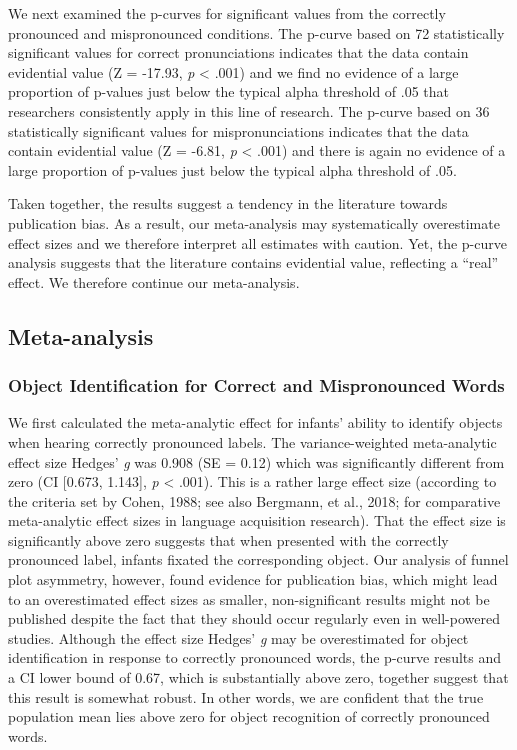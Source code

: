 \documentclass[man]{apa6}
\theoremstyle{definition}
\theoremstyle{definition}
\theoremstyle{definition}
\theoremstyle{remark}
\begin{document}
We next examined the p-curves for significant values from the correctly
pronounced and mispronounced conditions. The p-curve based on 72
statistically significant values for correct pronunciations indicates
that the data contain evidential value (Z = -17.93, \emph{p} \textless{}
.001) and we find no evidence of a large proportion of p-values just
below the typical alpha threshold of .05 that researchers consistently
apply in this line of research. The p-curve based on 36 statistically
significant values for mispronunciations indicates that the data contain
evidential value (Z = -6.81, \emph{p} \textless{} .001) and there is
again no evidence of a large proportion of p-values just below the
typical alpha threshold of .05.

Taken together, the results suggest a tendency in the literature towards
publication bias. As a result, our meta-analysis may systematically
overestimate effect sizes and we therefore interpret all estimates with
caution. Yet, the p-curve analysis suggests that the literature contains
evidential value, reflecting a \enquote{real} effect. We therefore
continue our meta-analysis.

\subsection{Meta-analysis}\label{meta-analysis-1}

\subsubsection{Object Identification for Correct and Mispronounced
Words}\label{object-identification-for-correct-and-mispronounced-words}

We first calculated the meta-analytic effect for infants' ability to
identify objects when hearing correctly pronounced labels. The
variance-weighted meta-analytic effect size Hedges' \emph{g} was 0.908
(SE = 0.12) which was significantly different from zero (CI {[}0.673,
1.143{]}, \emph{p} \textless{} .001). This is a rather large effect size
(according to the criteria set by Cohen, 1988; see also Bergmann, et
al., 2018; for comparative meta-analytic effect sizes in language
acquisition research). That the effect size is significantly above zero
suggests that when presented with the correctly pronounced label,
infants fixated the corresponding object. Our analysis of funnel plot
asymmetry, however, found evidence for publication bias, which might
lead to an overestimated effect sizes as smaller, non-significant
results might not be published despite the fact that they should occur
regularly even in well-powered studies. Although the effect size Hedges'
\emph{g} may be overestimated for object identification in response to
correctly pronounced words, the p-curve results and a CI lower bound of
0.67, which is substantially above zero, together suggest that this
result is somewhat robust. In other words, we are confident that the
true population mean lies above zero for object recognition of correctly
pronounced words.
\end{document}
